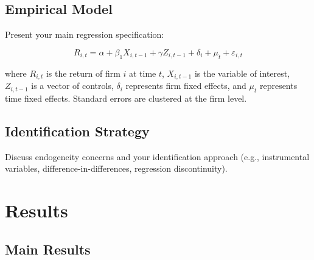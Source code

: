 \documentclass[12pt,a4paper]{article}
\begin{document}
\subsection{Empirical Model}

Present your main regression specification:

\begin{equation}
\label{eq:main}
R_{i,t} = \alpha + \beta_1 X_{i,t-1} + \gamma Z_{i,t-1} + \delta_i + \mu_t + \varepsilon_{i,t}
\end{equation}

\noindent where $R_{i,t}$ is the return of firm $i$ at time $t$, $X_{i,t-1}$ is the variable of interest, $Z_{i,t-1}$ is a vector of controls, $\delta_i$ represents firm fixed effects, and $\mu_t$ represents time fixed effects. Standard errors are clustered at the firm level.

\subsection{Identification Strategy}

Discuss endogeneity concerns and your identification approach (e.g., instrumental variables, difference-in-differences, regression discontinuity).

\section{Results}
\label{sec:results}

\subsection{Main Results}
\end{document}

